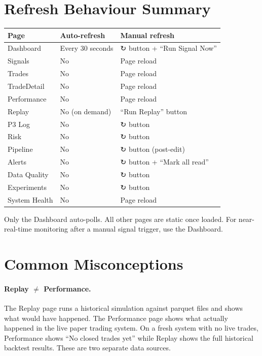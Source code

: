 \documentclass[12pt, a4paper]{article}
\begin{document}
\section{Refresh Behaviour Summary}

\begin{table}[H]
\centering\small
\begin{tabular}{lll}
\toprule
Page & Auto-refresh & Manual refresh \\
\midrule
Dashboard         & Every 30 seconds & ↻ button + ``Run Signal Now'' \\
Signals           & No               & Page reload \\
Trades            & No               & Page reload \\
TradeDetail       & No               & Page reload \\
Performance       & No               & Page reload \\
Replay            & No (on demand)   & ``Run Replay'' button \\
P3 Log            & No               & ↻ button \\
Risk              & No               & ↻ button \\
Pipeline          & No               & ↻ button (post-edit) \\
Alerts            & No               & ↻ button + ``Mark all read'' \\
Data Quality      & No               & ↻ button \\
Experiments       & No               & ↻ button \\
System Health     & No               & Page reload \\
\bottomrule
\end{tabular}
\end{table}

Only the Dashboard auto-polls. All other pages are static once loaded.
For near-real-time monitoring after a manual signal trigger, use the Dashboard.


\section{Common Misconceptions}

\paragraph{Replay $\neq$ Performance.}
The Replay page runs a historical simulation against parquet files and shows
what would have happened. The Performance page shows what actually happened
in the live paper trading system. On a fresh system with no live trades,
Performance shows ``No closed trades yet'' while Replay shows the full
historical backtest results. These are two separate data sources.
\end{document}
